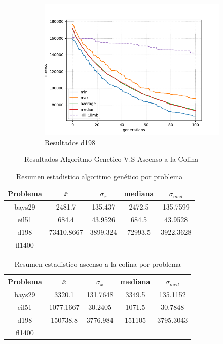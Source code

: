 \documentclass[twocolumn]{IEEEtran}
\begin{document}
\begin{figure}
\begin{subfigure}[b]{1\linewidth}
        \includegraphics[width=\linewidth]{figures/tspd198.png}
        \caption{Resultados d198}
    \end{subfigure}
    \caption{Resultados Algoritmo Genetico V.S Ascenso a la Colina}
\end{figure}

\begin{table}[htpb]
\centering
\begin{tabular}{|c|c|c|c|c|}
    \hline
    Problema & $\bar{x}$ & $\sigma_{\bar{x}}$ & mediana & $\sigma_{med}$ \\
    \hline
    bays29 & 2481.7 & 135.437 & 2472.5 & 135.7599 \\
    \hline
    eil51 & 684.4 & 43.9526 & 684.5 & 43.9528 \\
    \hline
    d198 & 73410.8667 & 3899.324 & 72993.5 & 3922.3628 \\
    \hline
    fl1400 & & & & \\
    \hline
\end{tabular}
\caption{Resumen estadistico algoritmo genético por problema}
\label{table:results_ga}
\end{table}

\begin{table}[htpb]
    \centering
    \begin{tabular}{|c|c|c|c|c|}
        \hline
        Problema & $\bar{x}$ & $\sigma_{\bar{x}}$ & mediana & $\sigma_{med}$ \\
        \hline
        bays29 & 3320.1 & 131.7648 & 3349.5 & 135.1152 \\
        \hline
        eil51 & 1077.1667 & 30.2405 & 1071.5 & 30.7848 \\
        \hline
        d198 & 150738.8 & 3776.984 & 151105 & 3795.3043 \\
        \hline
        fl1400 & & & & \\
        \hline
    \end{tabular}
    \caption{Resumen estadistico ascenso a la colina por problema}
    \label{table:results_hc}
    \end{table}
\end{document}
